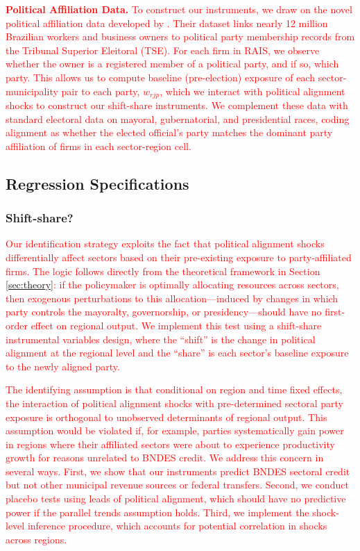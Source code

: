 \documentclass{article}
\begin{document}
\textcolor{red}{\textbf{Political Affiliation Data.} To construct our instruments, we draw on the novel political affiliation data developed by \citet{colonnelli2025politics}. Their dataset links nearly 12 million Brazilian workers and business owners to political party membership records from the Tribunal Superior Eleitoral (TSE). For each firm in RAIS, we observe whether the owner is a registered member of a political party, and if so, which party. This allows us to compute baseline (pre-election) exposure of each sector-municipality pair to each party, $w_{rjp}$, which we interact with political alignment shocks to construct our shift-share instruments. We complement these data with standard electoral data on mayoral, gubernatorial, and presidential races, coding alignment as whether the elected official's party matches the dominant party affiliation of firms in each sector-region cell.}






\subsection{Regression Specifications}\label{sec:regs}

\subsubsection{Shift-share?}


\textcolor{red}{Our identification strategy exploits the fact that political alignment shocks differentially affect sectors based on their pre-existing exposure to party-affiliated firms. The logic follows directly from the theoretical framework in Section \ref{sec:theory}: if the policymaker is optimally allocating resources across sectors, then exogenous perturbations to this allocation---induced by changes in which party controls the mayoralty, governorship, or presidency---should have no first-order effect on regional output. We implement this test using a shift-share instrumental variables design, where the ``shift'' is the change in political alignment at the regional level and the ``share'' is each sector's baseline exposure to the newly aligned party.}

\textcolor{red}{The identifying assumption is that conditional on region and time fixed effects, the interaction of political alignment shocks with pre-determined sectoral party exposure is orthogonal to unobserved determinants of regional output. This assumption would be violated if, for example, parties systematically gain power in regions where their affiliated sectors were about to experience productivity growth for reasons unrelated to BNDES credit. We address this concern in several ways. First, we show that our instruments predict BNDES sectoral credit but not other municipal revenue sources or federal transfers. Second, we conduct placebo tests using leads of political alignment, which should have no predictive power if the parallel trends assumption holds. Third, we implement the \citet{borusyak2022quasi} shock-level inference procedure, which accounts for potential correlation in shocks across regions.}
\end{document}

